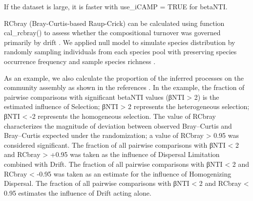 \documentclass[
]{book}
\newenvironment{Shaded}{\begin{snugshade}}{\end{snugshade}}
\newcommand{\AttributeTok}[1]{\textcolor[rgb]{0.77,0.63,0.00}{#1}}
\newcommand{\CommentTok}[1]{\textcolor[rgb]{0.56,0.35,0.01}{\textit{#1}}}
\newcommand{\ConstantTok}[1]{\textcolor[rgb]{0.00,0.00,0.00}{#1}}
\newcommand{\DecValTok}[1]{\textcolor[rgb]{0.00,0.00,0.81}{#1}}
\newcommand{\FunctionTok}[1]{\textcolor[rgb]{0.00,0.00,0.00}{#1}}
\newcommand{\NormalTok}[1]{#1}
\newcommand{\OtherTok}[1]{\textcolor[rgb]{0.56,0.35,0.01}{#1}}
\newcommand{\SpecialCharTok}[1]{\textcolor[rgb]{0.00,0.00,0.00}{#1}}
\newcommand{\StringTok}[1]{\textcolor[rgb]{0.31,0.60,0.02}{#1}}
\begin{document}
If the dataset is large, it is faster with use\_iCAMP = TRUE for betaNTI.

\begin{Shaded}
\end{Shaded}

RCbray (Bray-Curtis-based Raup-Crick) can be calculated using function cal\_rcbray()
to assess whether the compositional turnover was governed primarily by drift \citep{Chase_null_2011}.
We applied null model to simulate species distribution by randomly sampling individuals from each
species pool with preserving species occurrence frequency and sample species richness \citep{Liu_Long_term_2017}.

\begin{Shaded}
\end{Shaded}

As an example, we also calculate the proportion of the inferred processes on the community assembly as shown in the references \citep{Stegen_Quantifying_2013, Liu_Long_term_2017}.
In the example, the fraction of pairwise comparisons with significant betaNTI values (\textbar βNTI\textbar{} \textgreater{} 2) is the estimated influence of Selection;
βNTI \textgreater{} 2 represents the heterogeneous selection; βNTI \textless{} -2 represents the homogeneous selection.
The value of RCbray characterizes the magnitude of deviation between observed Bray--Curtis and Bray--Curtis expected under the randomization;
a value of \textbar RCbray\textbar{} \textgreater{} 0.95 was considered significant.
The fraction of all pairwise comparisons with \textbar βNTI\textbar{} \textless{} 2 and RCbray \textgreater{} +0.95 was taken as the influence of Dispersal Limitation combined with Drift.
The fraction of all pairwise comparisons with \textbar βNTI\textbar{} \textless{} 2 and RCbray \textless{} -0.95 was taken as an estimate for the influence of Homogenizing Dispersal.
The fraction of all pairwise comparisons with \textbar βNTI\textbar{} \textless{} 2 and \textbar RCbray\textbar{} \textless{} 0.95 estimates the influence of Drift acting alone.
\end{document}
